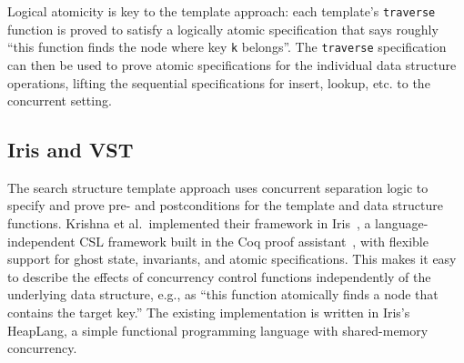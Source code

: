 \documentclass[a4paper,UKenglish,cleveref, autoref, thm-restate]{lipics-v2021}
\begin{document}

Logical atomicity is key to the template approach: each template's \lstinline{traverse} function is proved to satisfy a logically atomic specification that says roughly ``this function finds the node where key \lstinline{k} belongs''. The \lstinline{traverse} specification can then be used to prove atomic specifications for the individual data structure operations, lifting the sequential specifications for insert, lookup, etc. to the concurrent setting.

\subsection{Iris and VST}
The search structure template approach uses concurrent separation logic to specify and prove pre- and postconditions for the template and data structure functions. Krishna et al.~implemented their framework in Iris~\cite{iris}, a language-independent CSL framework built in the Coq proof assistant~\cite{coq}, with flexible support for ghost state, invariants, and atomic specifications. This makes it easy to describe the effects of concurrency control functions independently of the underlying data structure, e.g., as ``this function atomically finds a node that contains the target key.'' %
The existing implementation is written in Iris's HeapLang, a simple functional programming language with shared-memory concurrency.
\end{document}
